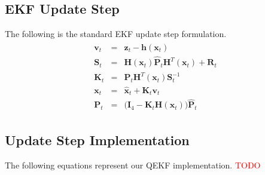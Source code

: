 \documentclass[letterpaper, 10 pt, conference]{ieeeconf}  %
\begin{document}
\subsection{EKF Update Step}
The following is the standard EKF update step formulation.
\begin{equation}
\begin{split}\begin{array}{rcl}
        \mathbf{v}_t &=& \mathbf{z}_t - \mathbf{h}(\mathbf{x}_t) \\
        \mathbf{S}_t &=& \mathbf{H}(\mathbf{x}_t) \hat{\mathbf{P}}_t \mathbf{H}^T(\mathbf{x}_t) + \mathbf{R}_t \\
        \mathbf{K}_t &=& \hat{\mathbf{P}}_t \mathbf{H}^T(\mathbf{x}_t) \mathbf{S}_t^{-1} \\
        \mathbf{x}_t &=& \hat{\mathbf{x}}_t + \mathbf{K}_t \mathbf{v}_t \\
        \mathbf{P}_t &=& \big(\mathbf{I}_4 - \mathbf{K}_t\mathbf{H}(\mathbf{x}_t)\big)\hat{\mathbf{P}}_t
\end{array}\end{split}
\end{equation}



\subsection{Update Step Implementation}
The following equations represent our QEKF implementation.
\textcolor{red}{TODO}
\end{document}
